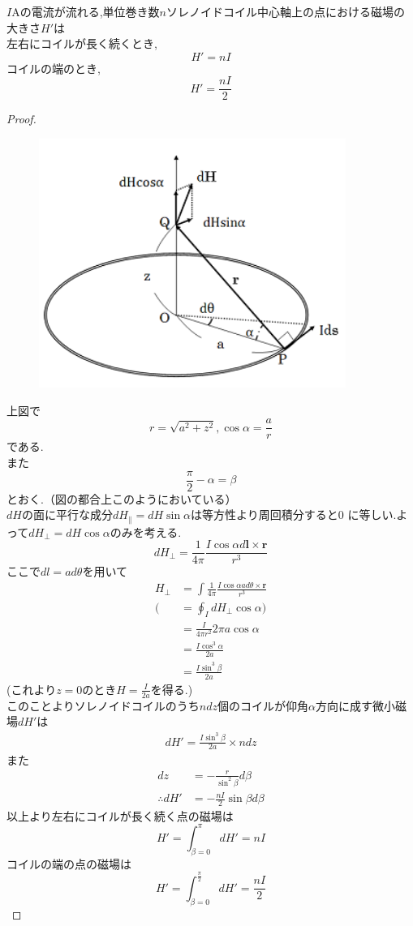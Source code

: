 \documentclass[dvipdfmx,uplatex]{jsarticle}
\begin{document}
\begin{theo}
$I \si{\ampere}$の電流が流れる,単位巻き数$n$ソレノイドコイル中心軸上の点における磁場の大きさ$H'$は \\
左右にコイルが長く続くとき,
\[
H' = nI
\]
コイルの端のとき,
\[
H' = \frac{nI}{2}
\]
\end{theo}
\begin{proof} 

\begin{figure}[htbp]
\begin{center}
\includegraphics[width=100mm]{Biot-savart.png}
\end{center}
\end{figure}
上図で
\[
r = \sqrt{a^2 + z^2}, \cos \alpha = \frac{a}{r}
\]
である.\\
また
\[
\frac{\pi}{2} - \alpha = \beta
\]
とおく.（図の都合上このようにおいている） \\
$dH$の面に平行な成分$dH_{\parallel} = dH \sin \alpha$は等方性より周回積分すると$0$ に等しい.よって$dH_{\perp} = dH \cos \alpha$のみを考える.
\[
dH_{\perp} = \frac{1}{4 \pi} \frac{I \cos \alpha d\bm{l} \times \bm{r}}{r^3}
\]
ここで$dl = a d \theta$を用いて
\begin{align*}
H_{\perp} &= \int \frac{1}{4 \pi} \frac{I \cos \alpha a d\theta \times \bm{r}}{r^3} \\
(&= \oint_I dH_{\perp}\cos \alpha ) \\
&= \frac{I}{4 \pi r^2} 2 \pi a \cos \alpha \\
&= \frac{I \cos^3 \alpha}{2a} \\
&= \frac{I \sin^3 \beta}{2a}
\end{align*}
(これより$z=0$のとき$H=\frac{I}{2a}$を得る.) \\
このことよりソレノイドコイルのうち$ndz$個のコイルが仰角$\alpha$方向に成す微小磁場$dH'$は
\begin{align*}
dH' = \frac{I \sin^3 \beta}{2a} \times n dz
\end{align*}
また
\begin{align*}
dz &= -\frac{r}{\sin^2 \beta} d \beta \\
\therefore dH' &= -\frac{nI}{2}\sin \beta d \beta
\end{align*}
以上より左右にコイルが長く続く点の磁場は
\[
H' = \int^{\pi}_{\beta = 0} dH' = nI
\]
コイルの端の点の磁場は
\[
H' = \int^{\frac{\pi}{2}}_{\beta = 0} dH' = \frac{nI}{2}
\]

\end{proof}
\end{document}

